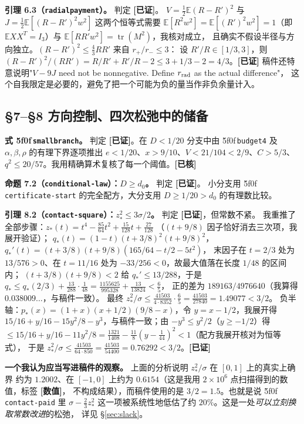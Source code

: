 \documentclass[UTF8,11pt]{ctexart}
\theoremstyle{definition}
\newcommand{\tr}{\operatorname{tr}}
\newcommand{\E}{\mathbb{E}}
\newcommand{\peq}[1]{\textup{\u5f0f}\,\texttt{#1}}
\newcommand{\ok}{\textcolor[rgb]{0.05,0.45,0.15}{\bfseries [已证]}}
\newcommand{\chk}{\textcolor[rgb]{0.05,0.25,0.55}{\bfseries [已核]}}
\newcommand{\num}{\textcolor[rgb]{0.55,0.35,0.00}{\bfseries [数值]}}
\begin{document}
\textbf{引理 6.3（\texttt{radialpayment}）。} 判定 \ok。
$V=\frac12\E(R-R')^2$ 与 $J=\frac12\E[(R-R')^2w^2]$ 这两个恒等式需要
$\E[R^2w^2]=\E[(R')^2w^2]=1$（即 $\E XX^T=I_3$）与 $\E[RR'w^2]=\tr(M^2)$，我核对成立，
且确实不假设半径与方向独立。$(R-R')^2\le\frac43RR'$ 来自 $r_+/r_-\le3$：
设 $R'/R\in[1/3,3]$，则 $(R-R')^2/(RR')=R/R'+R'/R-2\le3+1/3-2=4/3$。\hfill\ok
稿件还特意说明"$V-9J$ need not be nonnegative. Define $r_{\rm rad}$ as the actual difference"，
这个自我限定是必要的，避免了把一个可能为负的量当作非负余量计入。

\subsection{\S7--\S8 方向控制、四次松弛中的储备}

\textbf{式 \peq{smallbranch}。} 判定 \ok。在 $D<1/20$ 分支中由 \peq{budget4} 及
$\alpha,\beta,\rho$ 的有理下界逐项推出 $e<1/20$、$x>9/10$、$V<21/104<2/9$、$C>5/3$、
$q^2\le20/57$。我用精确算术复核了每一个阈值。\hfill\chk

\textbf{命题 7.2（\texttt{conditional-law}）：$D\ge d_0$。} 判定 \ok。
小分支用 \peq{certificate-start} 的完全配方，大分支用 $D\ge1/20>d_0$ 的有理数比较。

\textbf{引理 8.2（\texttt{contact-square}）：$z_*^2\le3\sigma/2$。} 判定 \ok，但常数不紧。
我重推了全部步骤：$z_*(t)=t^4-\frac{85}{64}t^2+\frac{15}{128}t+\frac{27}{128}$
（$(t+9/8)$ 因子恰好消去三次项，我展开验证）；
$q_*(t)=(1-t)(t+3/8)^2(t+9/8)^2$，$q_*'(t)=(t+3/8)(t+9/8)(165/64-t/2-5t^2)$，
末因子在 $t=2/3$ 处为 $13/576>0$、在 $t=11/16$ 处为 $-33/256<0$，故最大值落在长度 $1/48$ 的区间内；
$(t+3/8)(t+9/8)<2$ 给 $q_*'\le13/288$，于是
$q_*\le q_*(2/3)+\frac{13}{288}\cdot\frac1{48}=\frac{1155625}{995328}+\frac{13}{13824}<\frac65$，
正的差为 $189163/4976640$（我算得 $0.038009\ldots$，与稿件一致）。
最终 $z_*^2/\sigma\le\frac{41503}{4\cdot8352}\cdot\frac65=\frac{41503}{27840}=1.49077<3/2$。
负半轴：$p_*(x)=(1+x)(x+1/2)(9/8-x)$，令 $y=x-1/2$，我展开得
$15/16+y/16-15y^2/8-y^3$，与稿件一致；由 $-y^3\le y^2/2$（$y\ge-1/2$）得
$\le15/16+y/16-11y^2/8=\frac{1321}{1408}-\frac{11}8(y-\frac1{44})^2<1$（配方我展开核对为恒等式），
于是 $z_*^2/\sigma\le\frac{41503}{64\cdot850}=\frac{41503}{54400}=0.76292<3/2$。\hfill\ok

\textbf{一个我认为应当写进稿件的观察。} 上面的分析说明 $z_*^2/\sigma$ 在 $[0,1]$ 上的真实上确界
约为 $1.2002$、在 $[-1,0]$ 上约为 $0.6154$（这是我用 $2\times10^6$ 点扫描得到的数值，标签 \num，
不构成结果），而稿件使用的是 $3/2=1.5$。也就是说 \peq{contact-paid} 里
$\sigma-\frac23z_*^2$ 这一项被系统性地低估了约 $20\%$。这是一处\emph{可以立刻换取常数改进}的松弛，
详见 \S\ref{sec:slack}。
\end{document}
